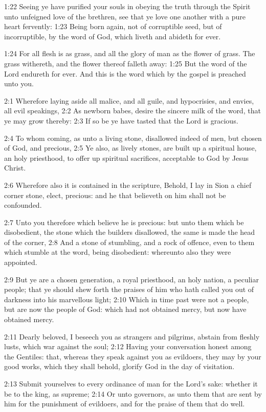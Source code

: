 1:22 Seeing ye have purified your souls in obeying the truth through the Spirit unto unfeigned love of the brethren, see that ye love one another with a pure heart fervently: 1:23 Being born again, not of corruptible seed, but of incorruptible, by the word of God, which liveth and abideth for ever.

1:24 For all flesh is as grass, and all the glory of man as the flower of grass. The grass withereth, and the flower thereof falleth away: 1:25 But the word of the Lord endureth for ever. And this is the word which by the gospel is preached unto you.

2:1 Wherefore laying aside all malice, and all guile, and hypocrisies, and envies, all evil speakings, 2:2 As newborn babes, desire the sincere milk of the word, that ye may grow thereby: 2:3 If so be ye have tasted that the Lord is gracious.

2:4 To whom coming, as unto a living stone, disallowed indeed of men, but chosen of God, and precious, 2:5 Ye also, as lively stones, are built up a spiritual house, an holy priesthood, to offer up spiritual sacrifices, acceptable to God by Jesus Christ.

2:6 Wherefore also it is contained in the scripture, Behold, I lay in Sion a chief corner stone, elect, precious: and he that believeth on him shall not be confounded.

2:7 Unto you therefore which believe he is precious: but unto them which be disobedient, the stone which the builders disallowed, the same is made the head of the corner, 2:8 And a stone of stumbling, and a rock of offence, even to them which stumble at the word, being disobedient: whereunto also they were appointed.

2:9 But ye are a chosen generation, a royal priesthood, an holy nation, a peculiar people; that ye should shew forth the praises of him who hath called you out of darkness into his marvellous light; 2:10 Which in time past were not a people, but are now the people of God: which had not obtained mercy, but now have obtained mercy.

2:11 Dearly beloved, I beseech you as strangers and pilgrims, abstain from fleshly lusts, which war against the soul; 2:12 Having your conversation honest among the Gentiles: that, whereas they speak against you as evildoers, they may by your good works, which they shall behold, glorify God in the day of visitation.

2:13 Submit yourselves to every ordinance of man for the Lord's sake: whether it be to the king, as supreme; 2:14 Or unto governors, as unto them that are sent by him for the punishment of evildoers, and for the praise of them that do well.

